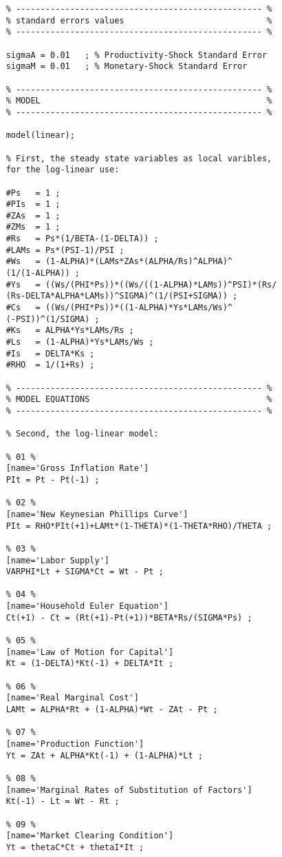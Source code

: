 \documentclass[
thesis.tex
]{subfiles}
\begin{document}
{\begin{verbatim}
	% -------------------------------------------------- % 
	% standard errors values                             %
	% -------------------------------------------------- %
	
	sigmaA = 0.01   ; % Productivity-Shock Standard Error
	sigmaM = 0.01   ; % Monetary-Shock Standard Error
	
	% -------------------------------------------------- %
	% MODEL                                              %
	% -------------------------------------------------- %
	
	model(linear);
	
	% First, the steady state variables as local varibles, 
	for the log-linear use:
	
	#Ps   = 1 ;
	#PIs  = 1 ;
	#ZAs  = 1 ;
	#ZMs  = 1 ;
	#Rs   = Ps*(1/BETA-(1-DELTA)) ;
	#LAMs = Ps*(PSI-1)/PSI ;
	#Ws   = (1-ALPHA)*(LAMs*ZAs*(ALPHA/Rs)^ALPHA)^
	(1/(1-ALPHA)) ;
	#Ys   = ((Ws/(PHI*Ps))*((Ws/((1-ALPHA)*LAMs))^PSI)*(Rs/
	(Rs-DELTA*ALPHA*LAMs))^SIGMA)^(1/(PSI+SIGMA)) ;
	#Cs   = ((Ws/(PHI*Ps))*((1-ALPHA)*Ys*LAMs/Ws)^
	(-PSI))^(1/SIGMA) ;
	#Ks   = ALPHA*Ys*LAMs/Rs ;
	#Ls   = (1-ALPHA)*Ys*LAMs/Ws ;
	#Is   = DELTA*Ks ;
	#RHO  = 1/(1+Rs) ;
	
	% -------------------------------------------------- % 
	% MODEL EQUATIONS                                    %
	% -------------------------------------------------- %
	
	% Second, the log-linear model:
	
	% 01 %
	[name='Gross Inflation Rate']
	PIt = Pt - Pt(-1) ;
	
	% 02 %
	[name='New Keynesian Phillips Curve']
	PIt = RHO*PIt(+1)+LAMt*(1-THETA)*(1-THETA*RHO)/THETA ;
	
	% 03 %
	[name='Labor Supply']
	VARPHI*Lt + SIGMA*Ct = Wt - Pt ;
	
	% 04 %
	[name='Household Euler Equation']
	Ct(+1) - Ct = (Rt(+1)-Pt(+1))*BETA*Rs/(SIGMA*Ps) ;
	
	% 05 %
	[name='Law of Motion for Capital']
	Kt = (1-DELTA)*Kt(-1) + DELTA*It ;
	
	% 06 %
	[name='Real Marginal Cost']
	LAMt = ALPHA*Rt + (1-ALPHA)*Wt - ZAt - Pt ;
	
	% 07 %
	[name='Production Function']
	Yt = ZAt + ALPHA*Kt(-1) + (1-ALPHA)*Lt ;
	
	% 08 %
	[name='Marginal Rates of Substitution of Factors']
	Kt(-1) - Lt = Wt - Rt ;
	
	% 09 %
	[name='Market Clearing Condition']
	Yt = thetaC*Ct + thetaI*It ;
	

\end{verbatim}}
\end{document}

